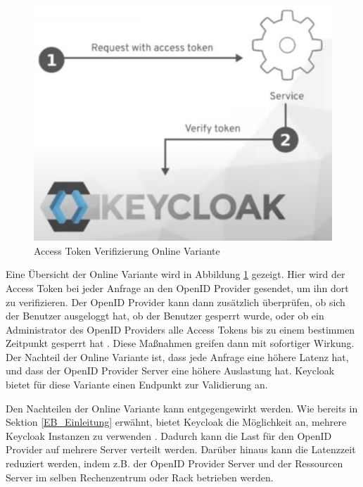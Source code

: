 \begin{figure}[!ht]
	\centering
	\includegraphics[width=.6\textwidth]{Images/Ebert/VerifyAccessTokenOnline.PNG}
	\caption{Access Token Verifizierung Online Variante \cite{EB32}}
	\label{fig:EB_Access Token Verifizierung Online Variante}
\end{figure}

Eine Übersicht der Online Variante wird in Abbildung \ref{fig:EB_Access Token Verifizierung Online Variante} gezeigt. Hier wird der Access Token bei jeder Anfrage an den OpenID Provider gesendet, um ihn dort zu verifizieren. Der OpenID Provider kann dann zusätzlich überprüfen, ob sich der Benutzer ausgeloggt hat, ob der Benutzer gesperrt wurde, oder ob ein Administrator des OpenID Providers alle Access Tokens bis zu einem bestimmen Zeitpunkt gesperrt hat \cite{EB32}. Diese Maßnahmen greifen dann mit sofortiger Wirkung. Der Nachteil der Online Variante ist, dass jede Anfrage eine höhere Latenz hat, und dass der OpenID Provider Server eine höhere Auslastung hat. Keycloak bietet für diese Variante einen Endpunkt zur Validierung an. 

Den Nachteilen der Online Variante kann entgegengewirkt werden. Wie bereits in Sektion \ref{EB_Einleitung} erwähnt, bietet Keycloak die Möglichkeit an, mehrere Keycloak Instanzen zu verwenden \cite{EB33}. Dadurch kann die Last für den OpenID Provider auf mehrere Server verteilt werden. Darüber hinaus kann die Latenzzeit reduziert werden, indem z.B. der OpenID Provider Server und der Ressourcen Server im selben Rechenzentrum oder Rack betrieben werden.




